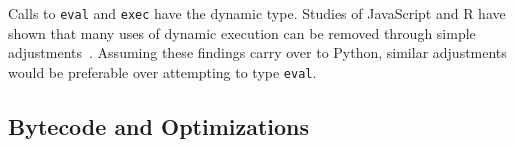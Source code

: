 \documentclass[english,cleveref,crc]{programming}
\newcommand{\SP}{Static Python}
\newcommand{\code}[1]{\texttt{#1}}
\begin{document}
Calls to \code{eval} and \code{exec} have the dynamic type.
%
Studies of JavaScript and R have shown that many uses of dynamic execution
can be removed through simple adjustments~\cite{rhbv-ecoop-2011,gdkkv-oopsla-2021,mrmv-esop-2012}.
Assuming these findings carry over to Python, similar adjustments would be
preferable over attempting to type \code{eval}.




\subsection{Bytecode and Optimizations}
\label{s:optimize}
\end{document}
